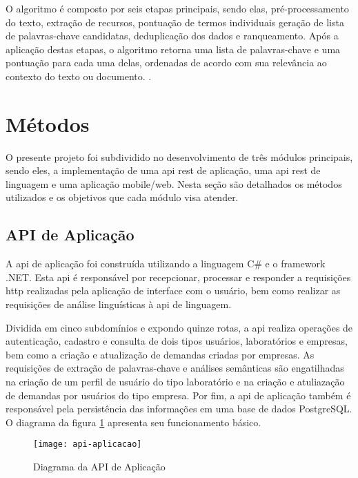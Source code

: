 O algoritmo é composto por seis etapas principais, sendo elas, pré-processamento do texto, extração de recursos, pontuação de termos individuais geração de lista de palavras-chave candidatas, deduplicação dos dados e ranqueamento. Após a aplicação destas etapas, o algoritmo retorna uma lista de palavras-chave e uma pontuação para cada uma delas, ordenadas de acordo com sua relevância ao contexto do texto ou documento. \cite{YakeKeywordExtractor}.

\section{Métodos}\label{sec:metodo}

O presente projeto foi subdividido no desenvolvimento de três módulos principais, sendo eles, a implementação de uma \gls{api} \gls{rest} de aplicação, uma \gls{api} \gls{rest} de linguagem e uma aplicação mobile/web. Nesta seção são detalhados os métodos utilizados e os objetivos que cada módulo visa atender.

\subsection{API de Aplicação}\label{subsec:app_api}

A \gls{api} de aplicação foi construída utilizando a linguagem C{\#} e o framework .NET. Esta \gls{api} é responsável por recepcionar, processar e responder a requisições \gls{http} realizadas pela aplicação de interface com o usuário, bem como realizar as requisições de análise linguísticas à \gls{api} de linguagem.

Dividida em cinco subdomínios e expondo quinze rotas, a \gls{api} realiza operações de autenticação, cadastro e consulta de dois tipos usuários, laboratórios e empresas, bem como a criação e atualização de demandas criadas por empresas. As requisições de extração de palavras-chave e análises semânticas são engatilhadas na criação de um perfil de usuário do tipo laboratório e na criação e atuliazação de demandas por usuários do tipo empresa. Por fim, a \gls{api} de aplicação também é responsável pela persistência das informações em uma base de dados PostgreSQL. O diagrama da figura \ref{fig:api_aplicacao} apresenta seu funcionamento básico.

\begin{figure}[htb]
    \caption{Diagrama da API de Aplicação}
    \texttt{[image: api-aplicacao]}
    \label{fig:api_aplicacao}
\end{figure}

